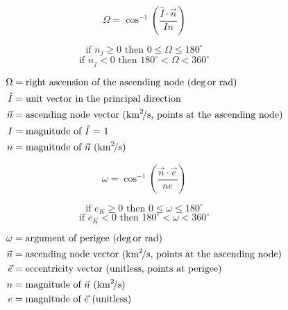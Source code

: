 \documentclass{article}
\begin{document}
\begin{multicols}{3}
	\begin{equation*}
	\boxed{\Omega = \cos^{-1}\left(\dfrac{\hat{I} \cdot \vec{n}}{In}\right)}
	\end{equation*}

	\begin{equation*}
	 \text{if } n_j \geq 0 \text{ then } 0 \leq \Omega \leq 180^\circ
	\end{equation*}
	\begin{equation*}
	\text{if } n_j < 0 \text{ then } 180^\circ < \Omega < 360^\circ
 	\end{equation*}

	\vfill\null
	\columnbreak

	\begin{align*}
	\Omega &= \text{right ascension of the ascending node (\si{\deg \text{or } \radian})}\\
	\hat{I} &= \text{unit vector in the principal direction}\\
	\vec{n} &= \text{ascending node vector (\si{\kilo\meter\squared\per\second}, points at the ascending node)}\\
	I &= \text{magnitude of $\hat{I}$ = 1}\\
	n &= \text{magnitude of $\vec{n}$ (\si{\kilo\meter\squared\per\second})}\\
	\end{align*}
\end{multicols}

\begin{multicols}{3}
	\begin{equation*}
	\boxed{\omega = \cos^{-1} \left(\dfrac{\vec{n}\cdot\vec{e}}{ne}\right)}
	\end{equation*}
	
	\begin{equation*}
	\text{if } e_K \geq 0 \text{ then } 0 \leq \omega \leq 180^\circ
	\end{equation*}
	\begin{equation*}
	\text{if } e_K < 0 \text{ then } 180^\circ < \omega < 360^\circ
	\end{equation*}

	\vfill\null
	\columnbreak

	\begin{align*}
	\omega &= \text{argument of perigee (\si{\deg \text{or } \radian})}\\
	\vec{n} &= \text{ascending node vector (\si{\kilo\meter\squared\per\second}, points at the ascending node)}\\
	\vec{e} &= \text{eccentricity vector (unitless, points at perigee)}\\
	n &= \text{magnitude of $\vec{n}$ (\si{\kilo\meter\squared\per\second})}\\
	e &= \text{magnitude of $\vec{e}$ (unitless)}\\
	\end{align*}
\end{multicols}
\end{document}
